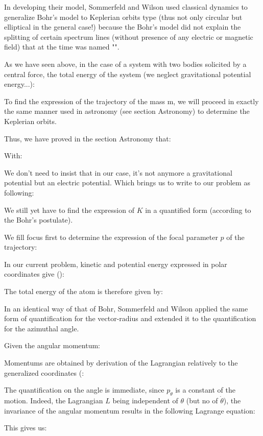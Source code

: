 	In developing their model, Sommerfeld and Wilson used classical dynamics to generalize Bohr's model to Keplerian orbits type (thus not only circular but elliptical in the general case!) because the Bohr's model did not explain the splitting of certain spectrum lines (without presence of any electric or magnetic field) that at the time was named "".
	
	As we have seen above, in the case of a system with two bodies solicited by a central force, the total energy of the system (we neglect gravitational potential energy...):
	
	To find the expression of the trajectory of the mass m, we will proceed in exactly the same manner used in astronomy (see section Astronomy) to determine the Keplerian orbits.
	
	Thus, we have proved in the section Astronomy that:
	
	With:
	
	We don't need to insist that in our case, it's not anymore a gravitational potential but an electric potential. Which brings us to write to our problem as following:
	
	We still yet have to find the expression of $K$ in a quantified form (according to the Bohr's postulate).
	
	We fill focus first to determine the expression of the focal parameter $p$ of the trajectory:
	
	In our current problem, kinetic and potential energy expressed in polar coordinates give ():
	
	The total energy of the atom is therefore given by:
	
	In an identical way of that of Bohr, Sommerfeld and Wilson applied the same form of quantification for the vector-radius and extended it to the quantification for the azimuthal angle.
	
	Given the angular momentum:
	
	Momentums are obtained by derivation of the Lagrangian relatively to the generalized coordinates (:
	
	The quantification on the angle is immediate, since $p_\theta$ is a constant of the motion. Indeed, the Lagrangian $L$ being independent of $\theta$ (but no of $\dot{\theta}$), the invariance of the angular momentum results in the following Lagrange equation:
	
	This gives us:
	
